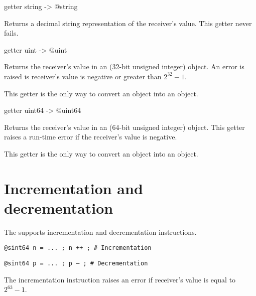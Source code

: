 
\begin{galgascode}
getter string -> @string
\end{galgascode}

Returns a decimal string representation of the receiver's value. This getter never fails.









\begin{galgascode}
getter uint -> @uint
\end{galgascode}

Returns the receiver's value in an  (32-bit unsigned integer) object. An error is raised is receiver's value is negative or greater than $2^{32}-1$.

This getter is the only way to convert an  object into an  object.






\begin{galgascode}
getter uint64 -> @uint64
\end{galgascode}

Returns the receiver's value in an  (64-bit unsigned integer) object. This getter raises a run-time error if the receiver's value is negative.

This getter is the only way to convert an  object into an  object.







\section{Incrementation and decrementation}

The  supports incrementation and decrementation instructions.

\texttt{@sint64 n = ... ; n ++ ; \# Incrementation}

\texttt{@sint64 p = ... ; p -- ; \# Decrementation}\newline

The incrementation instruction raises an error if receiver's value is equal to $2^{63}-1$.\newline

